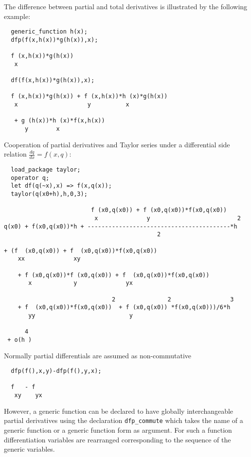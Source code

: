 The difference between partial and total derivatives is
illustrated by the following example:

\begin{verbatim}
  generic_function h(x);
  dfp(f(x,h(x))*g(h(x)),x);

  f (x,h(x))*g(h(x))
   x

  df(f(x,h(x))*g(h(x)),x);

  f (x,h(x))*g(h(x)) + f (x,h(x))*h (x)*g(h(x))
   x                    y          x

   + g (h(x))*h (x)*f(x,h(x))
      y        x
\end{verbatim}

Cooperation of partial derivatives and Taylor series under
a differential side relation $\frac{dq}{dx}=f(x,q)$:

\begin{verbatim}
  load_package taylor;
  operator q; 
  let df(q(~x),x) => f(x,q(x));
  taylor(q(x0+h),h,0,3);

                         f (x0,q(x0)) + f (x0,q(x0))*f(x0,q(x0))
                          x              y                         2
q(x0) + f(x0,q(x0))*h + -----------------------------------------*h
                                            2

+ (f  (x0,q(x0)) + f  (x0,q(x0))*f(x0,q(x0))
    xx              xy

    + f (x0,q(x0))*f (x0,q(x0)) + f  (x0,q(x0))*f(x0,q(x0))
       x            y              yx

                               2               2                 3
    + f  (x0,q(x0))*f(x0,q(x0))  + f (x0,q(x0)) *f(x0,q(x0)))/6*h
       yy                           y

      4
 + o(h )

\end{verbatim}

Normally partial differentials are assumed as non-commutative

\begin{verbatim}
  dfp(f(),x,y)-dfp(f(),y,x);

  f   - f
   xy    yx
\end{verbatim}

\hypertarget{command:DFP_COMMUTE}{}
However, a generic function can be declared to have globally
interchangeable partial derivatives using the declaration 
\texttt{dfp\_commute}
which takes the name of a generic function or a generic function
form as argument. For such a function differentiation variables are
rearranged corresponding to the sequence of the generic variables.

